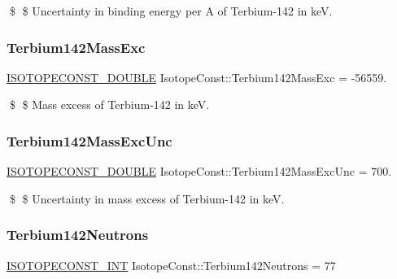 \$ \$ Uncertainty in binding energy per A of Terbium-\/142 in keV. \mbox{\label{group___isotope_const-_terbium-_tb142_ga7ca09b28a7167e263b605127b7a086c4}} 
\subsubsection{\texorpdfstring{Terbium142\+Mass\+Exc}{Terbium142MassExc}}
{\footnotesize\ttfamily \mbox{\hyperlink{group___isotope_const-_macros_ga8f45a7272ce02c0b4c65c44636ed719a}{I\+S\+O\+T\+O\+P\+E\+C\+O\+N\+S\+T\+\_\+\+D\+O\+U\+B\+LE}} Isotope\+Const\+::\+Terbium142\+Mass\+Exc = -\/56559.}

\$ \$ Mass excess of Terbium-\/142 in keV. \mbox{\label{group___isotope_const-_terbium-_tb142_ga5e6a4b9bf2434bb30aeb3884fbc3677a}} 
\subsubsection{\texorpdfstring{Terbium142\+Mass\+Exc\+Unc}{Terbium142MassExcUnc}}
{\footnotesize\ttfamily \mbox{\hyperlink{group___isotope_const-_macros_ga8f45a7272ce02c0b4c65c44636ed719a}{I\+S\+O\+T\+O\+P\+E\+C\+O\+N\+S\+T\+\_\+\+D\+O\+U\+B\+LE}} Isotope\+Const\+::\+Terbium142\+Mass\+Exc\+Unc = 700.}

\$ \$ Uncertainty in mass excess of Terbium-\/142 in keV. \mbox{\label{group___isotope_const-_terbium-_tb142_ga0d1bce83e13d46d550ef3e7b1a355ac8}} 
\subsubsection{\texorpdfstring{Terbium142\+Neutrons}{Terbium142Neutrons}}
{\footnotesize\ttfamily \mbox{\hyperlink{group___isotope_const-_macros_ga5f18360b3e99483a35c32d789e62621c}{I\+S\+O\+T\+O\+P\+E\+C\+O\+N\+S\+T\+\_\+\+I\+NT}} Isotope\+Const\+::\+Terbium142\+Neutrons = 77}

